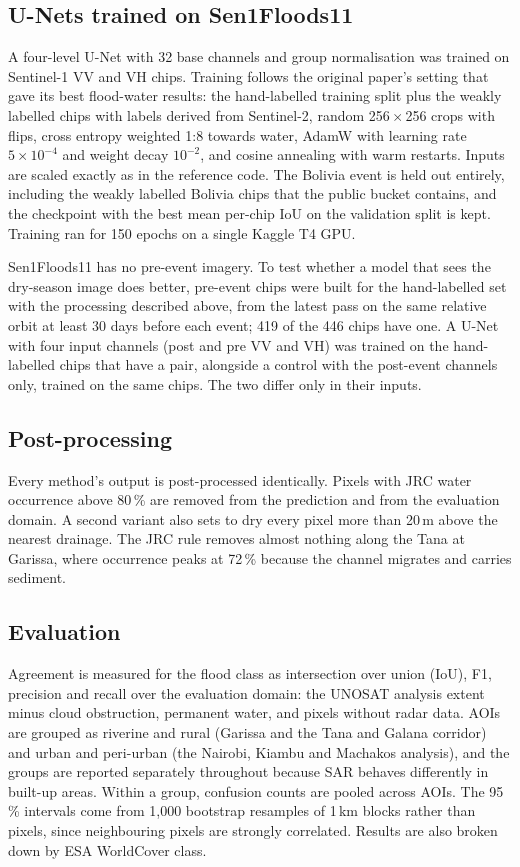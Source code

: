 \documentclass[11pt]{article}
\begin{document}
\subsection{U-Nets trained on Sen1Floods11}

A four-level U-Net \cite{ronneberger2015} with 32 base channels and group
normalisation was trained on Sentinel-1 VV and VH chips. Training follows the
original paper's setting that gave its best flood-water results: the
hand-labelled training split plus the weakly labelled chips with labels
derived from Sentinel-2, random 256\,$\times$\,256 crops with flips, cross
entropy weighted 1:8 towards water, AdamW with learning rate $5\times10^{-4}$
and weight decay $10^{-2}$, and cosine annealing with warm restarts. Inputs
are scaled exactly as in the reference code. The Bolivia event is held out
entirely, including the weakly labelled Bolivia chips that the public bucket
contains, and the checkpoint with the best mean per-chip IoU on the
validation split is kept. Training ran for 150 epochs on a single Kaggle T4
GPU.

Sen1Floods11 has no pre-event imagery. To test whether a model that sees the
dry-season image does better, pre-event chips were built for the
hand-labelled set with the processing described above, from the latest pass
on the same relative orbit at least 30 days before each event; 419 of the 446
chips have one. A U-Net with four input channels (post and pre VV and VH) was
trained on the hand-labelled chips that have a pair, alongside a control with
the post-event channels only, trained on the same chips. The two differ only in
their inputs.

\subsection{Post-processing}

Every method's output is post-processed identically. Pixels with JRC water
occurrence above 80\,\% are removed from the prediction and from the
evaluation domain. A second variant also sets to dry every pixel more than
20\,m above the nearest drainage. The JRC rule removes almost nothing along
the Tana at Garissa, where occurrence peaks at 72\,\% because the channel
migrates and carries sediment.

\subsection{Evaluation}

Agreement is measured for the flood class as intersection over union (IoU),
F1, precision and recall over the evaluation domain: the UNOSAT analysis
extent minus cloud obstruction, permanent water, and pixels without radar
data. AOIs are grouped as riverine and rural (Garissa and the Tana and Galana
corridor) and urban and peri-urban (the Nairobi, Kiambu and Machakos
analysis), and the groups are reported separately throughout because SAR
behaves differently in built-up areas. Within a group, confusion counts are
pooled across AOIs. The 95\,\% intervals come from 1,000 bootstrap resamples
of 1\,km blocks rather than pixels, since neighbouring pixels are strongly
correlated. Results are also broken down by ESA WorldCover class.
\end{document}
